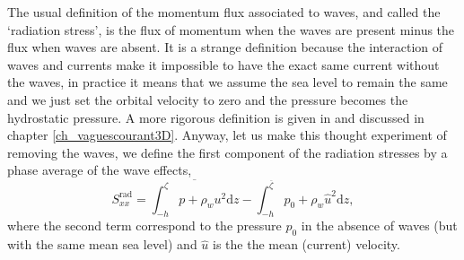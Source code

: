 The usual definition of the momentum flux associated to waves, and called the `radiation stress', is the 
flux of momentum when the waves are present minus the flux when waves are absent. It is a strange definition because the interaction of 
waves and currents make it impossible to have the exact same current without the waves, in practice it means 
that we assume the sea level to remain the same and we just set the orbital velocity to zero and the pressure becomes the hydrostatic pressure. 
A more rigorous definition is given in \cite{Andrews&McIntyre1978b}
and discussed in chapter \ref{ch_vaguescourant3D}. Anyway, let us make this thought experiment of  removing the waves, 
 we define the first component of the radiation stresses by a phase average of the wave effects, 
\begin{equation}
    S^{\mathrm{rad}}_{xx}=\overline{ \int_{-h}^\zeta p + \rho_w u^2 \mathrm{d}z }
    -\int_{-h}^{\overline{\zeta}} p_0 + \rho_w \widehat{u}^2   \mathrm{d}z,
\end{equation}
where the second term correspond to the pressure $p_0$ in the absence of waves (but with the same mean sea level) and $\widehat{u}$ is the 
the mean (current) velocity. 

